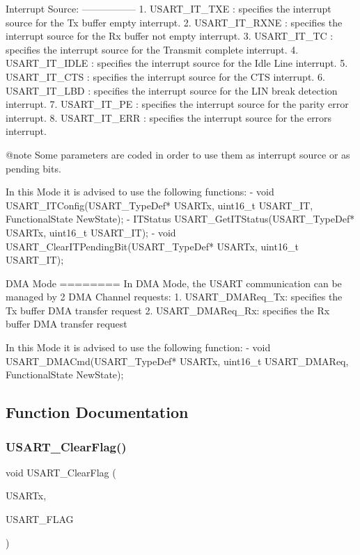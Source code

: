 \begin{DoxyVerb}
  Interrupt Source:
  -----------------
     1. USART_IT_TXE : specifies the interrupt source for the Tx buffer empty 
                       interrupt. 
     2. USART_IT_RXNE : specifies the interrupt source for the Rx buffer not 
                        empty interrupt.
     3. USART_IT_TC : specifies the interrupt source for the Transmit complete 
                       interrupt. 
     4. USART_IT_IDLE : specifies the interrupt source for the Idle Line interrupt.             
     5. USART_IT_CTS : specifies the interrupt source for the CTS interrupt. 
     6. USART_IT_LBD : specifies the interrupt source for the LIN break detection
                       interrupt. 
     7. USART_IT_PE : specifies the interrupt source for the parity error interrupt. 
     8. USART_IT_ERR :  specifies the interrupt source for the errors interrupt.

@note Some parameters are coded in order to use them as interrupt source or as pending bits.

  In this Mode it is advised to use the following functions:
     - void USART_ITConfig(USART_TypeDef* USARTx, uint16_t USART_IT, FunctionalState NewState);
     - ITStatus USART_GetITStatus(USART_TypeDef* USARTx, uint16_t USART_IT);
     - void USART_ClearITPendingBit(USART_TypeDef* USARTx, uint16_t USART_IT);

  DMA Mode
  ========
  In DMA Mode, the USART communication can be managed by 2 DMA Channel requests:
     1. USART_DMAReq_Tx: specifies the Tx buffer DMA transfer request
     2. USART_DMAReq_Rx: specifies the Rx buffer DMA transfer request

  In this Mode it is advised to use the following function:
     - void USART_DMACmd(USART_TypeDef* USARTx, uint16_t USART_DMAReq, FunctionalState NewState);\end{DoxyVerb}
 

\subsection{Function Documentation}
\mbox{\label{group___u_s_a_r_t___group9_gad962e148fc466ae1b45b288f6c91d966}} 
\subsubsection{\texorpdfstring{U\+S\+A\+R\+T\+\_\+\+Clear\+Flag()}{USART\_ClearFlag()}}
{\footnotesize\ttfamily void U\+S\+A\+R\+T\+\_\+\+Clear\+Flag (\begin{DoxyParamCaption}\item[{\hyperlink{struct_u_s_a_r_t___type_def}{U\+S\+A\+R\+T\+\_\+\+Type\+Def} $\ast$}]{U\+S\+A\+R\+Tx,  }\item[{uint16\+\_\+t}]{U\+S\+A\+R\+T\+\_\+\+F\+L\+AG }\end{DoxyParamCaption})}



